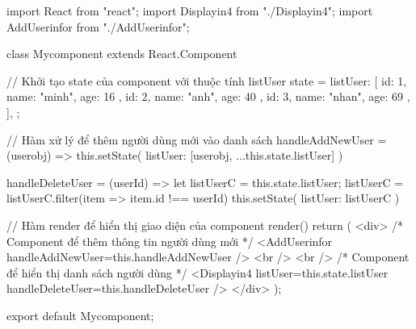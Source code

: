 import React from "react";
import Displayin4 from "./Displayin4";
import AddUserinfor from "./AddUserinfor";

class Mycomponent extends React.Component {
  // Khởi tạo state của component với thuộc tính listUser
  state = {
    listUser: [
      { id: 1, name: "minh", age: 16 },
      { id: 2, name: "anh", age: 40 },
      { id: 3, name: "nhan", age: 69 },
    ],
  };

  // Hàm xử lý để thêm người dùng mới vào danh sách
  handleAddNewUser = (userobj) => {
    this.setState({
      listUser: [userobj, ...this.state.listUser]
    })
  }

  handleDeleteUser = (userId) =>{
    let listUserC = this.state.listUser;
    listUserC = listUserC.filter(item => item.id !== userId)  
    this.setState({
      listUser: listUserC
    })
  }

  // Hàm render để hiển thị giao diện của component
  render() {
    return (
      <div>
        {/* Component để thêm thông tin người dùng mới */}
        <AddUserinfor handleAddNewUser={this.handleAddNewUser} />
        <br />
        <br />
        {/* Component để hiển thị danh sách người dùng */}
        <Displayin4 listUser={this.state.listUser} handleDeleteUser={this.handleDeleteUser} />
      </div>
    );
  }
}

export default Mycomponent;